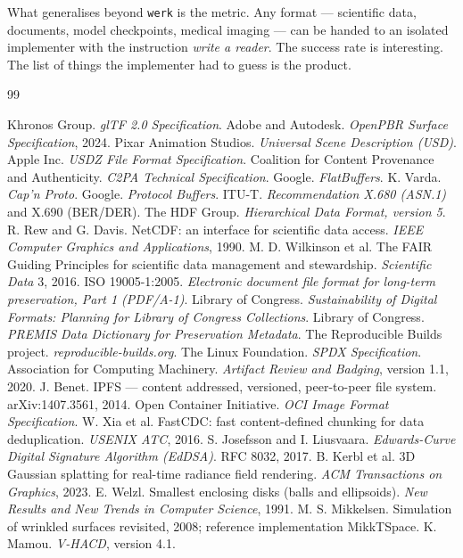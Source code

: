 \documentclass[10pt,twocolumn,letterpaper]{article}
\newcommand{\code}[1]{\texttt{\small #1}}
\begin{document}
What generalises beyond \code{werk} is the metric. Any format --- scientific data, documents, model checkpoints, medical imaging --- can be handed to an isolated implementer with the instruction \emph{write a reader}. The success rate is interesting. The list of things the implementer had to guess is the product.

\begin{thebibliography}{99}\footnotesize
\setlength{\itemsep}{0pt}

Khronos Group. \emph{glTF 2.0 Specification}.
Adobe and Autodesk. \emph{OpenPBR Surface Specification}, 2024.
Pixar Animation Studios. \emph{Universal Scene Description (USD)}.
Apple Inc. \emph{USDZ File Format Specification}.
Coalition for Content Provenance and Authenticity. \emph{C2PA Technical Specification}.
Google. \emph{FlatBuffers}.
K. Varda. \emph{Cap'n Proto}.
Google. \emph{Protocol Buffers}.
ITU-T. \emph{Recommendation X.680 (ASN.1)} and X.690 (BER/DER).
The HDF Group. \emph{Hierarchical Data Format, version 5}.
R. Rew and G. Davis. NetCDF: an interface for scientific data access. \emph{IEEE Computer Graphics and Applications}, 1990.
M. D. Wilkinson et al. The FAIR Guiding Principles for scientific data management and stewardship. \emph{Scientific Data} 3, 2016.
ISO 19005-1:2005. \emph{Electronic document file format for long-term preservation, Part 1 (PDF/A-1)}.
Library of Congress. \emph{Sustainability of Digital Formats: Planning for Library of Congress Collections}.
Library of Congress. \emph{PREMIS Data Dictionary for Preservation Metadata}.
The Reproducible Builds project. \emph{reproducible-builds.org}.
The Linux Foundation. \emph{SPDX Specification}.
Association for Computing Machinery. \emph{Artifact Review and Badging}, version 1.1, 2020.
J. Benet. IPFS --- content addressed, versioned, peer-to-peer file system. arXiv:1407.3561, 2014.
Open Container Initiative. \emph{OCI Image Format Specification}.
W. Xia et al. FastCDC: fast content-defined chunking for data deduplication. \emph{USENIX ATC}, 2016.
S. Josefsson and I. Liusvaara. \emph{Edwards-Curve Digital Signature Algorithm (EdDSA)}. RFC 8032, 2017.
B. Kerbl et al. 3D Gaussian splatting for real-time radiance field rendering. \emph{ACM Transactions on Graphics}, 2023.
E. Welzl. Smallest enclosing disks (balls and ellipsoids). \emph{New Results and New Trends in Computer Science}, 1991.
M. S. Mikkelsen. Simulation of wrinkled surfaces revisited, 2008; reference implementation MikkTSpace.
K. Mamou. \emph{V-HACD}, version 4.1.
\end{thebibliography}
\end{document}
